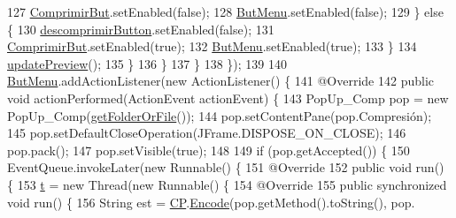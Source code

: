 \begin{DoxyCode}
127                             \hyperlink{classpresentacion_1_1form_1_1mainForm_a8a68ad38dda26d35d37dccec4fa9338d}{ComprimirBut}.setEnabled(\textcolor{keyword}{false});
128                             \hyperlink{classpresentacion_1_1form_1_1mainForm_aef69e0291d6680e935cf1161971b3b29}{ButMenu}.setEnabled(\textcolor{keyword}{false});
129                         \} \textcolor{keywordflow}{else} \{
130                             \hyperlink{classpresentacion_1_1form_1_1mainForm_a336e6855f8a19241d02376d4ff6a1802}{descomprimirButton}.setEnabled(\textcolor{keyword}{false});
131                             \hyperlink{classpresentacion_1_1form_1_1mainForm_a8a68ad38dda26d35d37dccec4fa9338d}{ComprimirBut}.setEnabled(\textcolor{keyword}{true});
132                             \hyperlink{classpresentacion_1_1form_1_1mainForm_aef69e0291d6680e935cf1161971b3b29}{ButMenu}.setEnabled(\textcolor{keyword}{true});
133                         \}
134                         \hyperlink{classpresentacion_1_1form_1_1mainForm_aa71c48a8ef6eb2b3913dd665e5439538}{updatePreview}();
135                     \}
136                 \}
137             \}
138         \});
139 
140         \hyperlink{classpresentacion_1_1form_1_1mainForm_aef69e0291d6680e935cf1161971b3b29}{ButMenu}.addActionListener(\textcolor{keyword}{new} ActionListener() \{
141             @Override
142             \textcolor{keyword}{public} \textcolor{keywordtype}{void} actionPerformed(ActionEvent actionEvent) \{
143                 PopUp\_Comp pop = \textcolor{keyword}{new} PopUp\_Comp(\hyperlink{classpresentacion_1_1form_1_1mainForm_af6d62b4914fbc44469a3c173e0472c43}{getFolderOrFile}());
144                 pop.setContentPane(pop.Compresión);
145                 pop.setDefaultCloseOperation(JFrame.DISPOSE\_ON\_CLOSE);
146                 pop.pack();
147                 pop.setVisible(\textcolor{keyword}{true});
148 
149                 \textcolor{keywordflow}{if} (pop.getAccepted()) \{
150                     EventQueue.invokeLater(\textcolor{keyword}{new} Runnable() \{
151                         @Override
152                         \textcolor{keyword}{public} \textcolor{keywordtype}{void} run() \{
153                             \hyperlink{classpresentacion_1_1form_1_1mainForm_a4643a7a227b8b65874d63d33a5adfc33}{t} = \textcolor{keyword}{new} Thread(\textcolor{keyword}{new} Runnable() \{
154                                 @Override
155                                 \textcolor{keyword}{public} \textcolor{keyword}{synchronized} \textcolor{keywordtype}{void} run() \{
156                                     String est = \hyperlink{classpresentacion_1_1form_1_1mainForm_a4d01396f002d4f9bd18db3877057c77b}{CP}.\hyperlink{classpresentacion_1_1Ctrl__Presentacio_1_1Ctrl__Presentacio_a83ea715afbbe389c6f1fb68f29121205}{Encode}(pop.getMethod().toString(), pop.

\end{DoxyCode}

